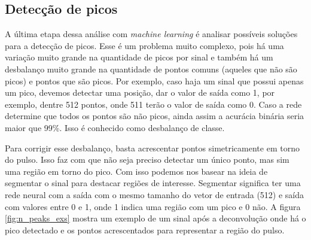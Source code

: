 \documentclass[a4paper,12pt,oneside]{book}
\begin{document}
\subsection{Detecção de picos}

\par A última etapa dessa análise com \textit{machine learning} é analisar possíveis soluções para a detecção de picos. Esse é um problema muito complexo, pois há uma variação muito grande na quantidade de picos por sinal e também há um desbalanço muito grande na quantidade de pontos comuns (aqueles que não são picos) e pontos que são picos. Por exemplo, caso haja um sinal que possui apenas um pico, devemos detectar uma posição, dar o valor de saída como 1, por exemplo, dentre 512 pontos, onde 511 terão o valor de saída como 0. Caso a rede determine que todos os pontos são não picos, ainda assim a acurácia binária seria maior que 99\%. Isso é conhecido como desbalanço de classe\cite{inproceedings}. 

\par Para corrigir esse desbalanço, basta acrescentar pontos simetricamente em torno do pulso. Isso faz com que não seja preciso detectar um único ponto, mas sim uma região em torno do pico. Com isso podemos nos basear na ideia de segmentar o sinal para destacar regiões de interesse\cite{aly2011research}. Segmentar significa ter uma rede neural com a saída com o mesmo tamanho do vetor de entrada (512) e saída com valores entre 0 e 1, onde 1 indica uma região com um pico e 0 não. A figura \ref{fig:n_peaks_exs} mostra um exemplo de um sinal após a deconvolução onde há o pico detectado e os pontos acrescentados para representar a região do pulso.

\end{document}
